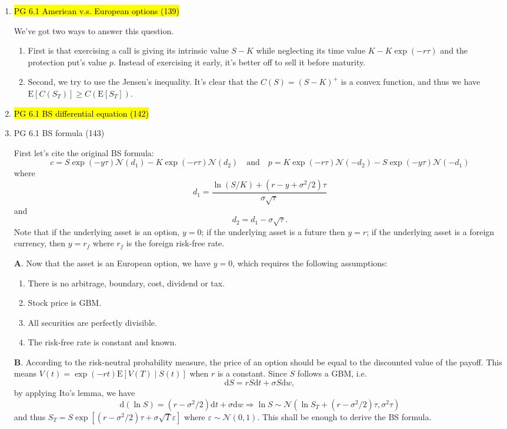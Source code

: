 \documentclass[11pt]{article}
\newcommand{\E}{\text{E}}
\newcommand{\bs}{\boldsymbol}
\renewcommand{\d}{\text{d}}
\renewcommand{\epsilon}{\varepsilon}
\newenvironment{note}{\begin{enumerate}[leftmargin=1em,topsep=0pt,noitemsep]}{\end{enumerate}}
\newenvironment{nnote}{\begin{enumerate}[leftmargin=.95em,topsep=0pt,noitemsep,label=$\bs{\cdot}$]}{\end{enumerate}}
\newcommand{\solution}{\boxed{\textbf{SOLUTION}}\hspace{.5em}}
\begin{document}
\begin{spacing}{1.1}
\begin{note}
\item \hl{PG 6.1 American v.s. European options (139)}

\solution We've got two ways to answer this question.

\begin{nnote}
\item First is that exercising a call is giving its intrinsic value $S-K$ while neglecting its time value $K - K\exp(-r\tau)$ and the protection put's value $p$. Instead of exercising it early, it's better off to sell it before maturity.
\item Second, we try to use the Jensen's inequality. It's clear that the $C(S)=(S-K)^{+}$ is a convex function, and thus we have $\E[C(S_T)]\ge C(\E[S_T])$.

\end{nnote}

\item \hl{PG 6.1 BS differential equation (142)}

\item PG 6.1 BS formula (143)

\solution First let's cite the original BS formula:
$$
c = S\exp(-y\tau)\mathcal{N}(d_1) - K\exp(-r\tau)\mathcal{N}(d_2)\quad \text{and}\quad p = K\exp(-r\tau)\mathcal{N}(-d_2) - S\exp(-y\tau)\mathcal{N}(-d_1)
$$
where
$$
d_1 = \frac{\ln(S/K) + (r-y+\sigma^2/2)\tau}{\sigma\sqrt{\tau}}
$$
and
$$
d_2 = d_1 - \sigma\sqrt{\tau}.
$$
Note that if the underlying asset is an option, $y=0$; if the underlying asset is a future then $y=r$; if the underlying asset is a foreign currency, then $y=r_f$ where $r_f$ is the foreign risk-free rate.

\textbf{A}. Now that the asset is an European option, we have $y=0$, which requires the following assumptions:
\begin{nnote}
\item There is no arbitrage, boundary, cost, dividend or tax.
\item Stock price is GBM.
\item All securities are perfectly divisible.
\item The risk-free rate is constant and known.
\end{nnote}

\textbf{B}. According to the risk-neutral probability measure, the price of an option should be equal to the discounted value of the payoff. This means $V(t) = \exp(-rt)\E[V(T)\mid S(t)]$ when $r$ is a constant. Since $S$ follows a GBM, i.e.
$$
\d S = rS\d t + \sigma S\d w,
$$
by applying Ito's lemma, we have
$$
\d (\ln S) = (r - \sigma^2/2)\d t + \sigma\d w\Rightarrow \ln S\sim\mathcal{N}(\ln S_T + (r - \sigma^2/2)\tau, \sigma^2\tau)
$$
and thus $S_T = S\exp[(r-\sigma^2/2)\tau + \sigma\sqrt{T}\epsilon]$ where $\epsilon\sim\mathcal{N}(0,1)$. This shall be enough to derive the BS formula. 


\end{note}
\end{spacing}
\end{document}
